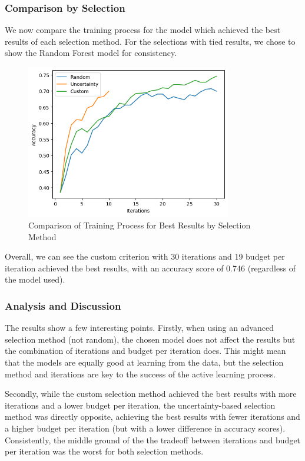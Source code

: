 \documentclass[12pt]{article}
\begin{document}
\subsubsection*{Comparison by Selection}

We now compare the training process for the model which achieved the best results of each selection method. For the selections with tied results, we chose to show the Random Forest model for consistency.

\begin{figure}[H]
    \centering
    \includegraphics[width=0.8\textwidth]{criterion_comparison.png}
    \caption{Comparison of Training Process for Best Results by Selection Method}
\end{figure}

Overall, we can see the custom criterion with 30 iterations and 19 budget per iteration achieved the best results, with an accuracy score of 0.746 (regardless of the model used).

\subsubsection*{Analysis and Discussion}

The results show a few interesting points. Firstly, when using an advanced selection method (not random), the chosen model does not affect the results but the combination of iterations and budget per iteration does. This might mean that the models are equally good at learning from the data, but the selection method and iterations are key to the success of the active learning process.

Secondly, while the custom selection method achieved the best results with more iterations and a lower budget per iteration, the uncertainty-based selection method was directly opposite, achieving the best results with fewer iterations and a higher budget per iteration (but with a lower difference in accuracy scores). Consistently, the middle ground of the the tradeoff between iterations and budget per iteration was the worst for both selection methods.
\end{document}
